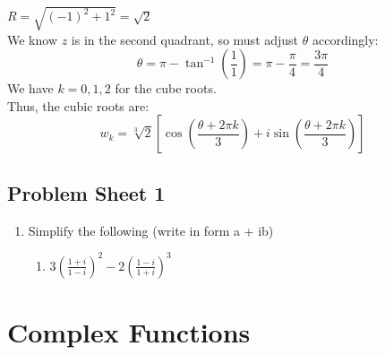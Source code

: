 \documentclass[a4paper, 10pt]{article}
\begin{document}
\begin{examplebox}[Find the cube roots of $z = -1 + i$]
  $R = \sqrt{(-1)^2 + 1^2} = \sqrt{2}$ \\
  We know $z$ is in the second quadrant, so must adjust $\theta$ accordingly:
  $$\theta = \pi - \tan^{-1}\left(\frac{1}{1}\right) = \pi - \frac{\pi}{4} = \frac{3\pi}{4}$$
  We have $k = 0,1,2$ for the cube roots. \\
  Thus, the cubic roots are:
  $$w_k = \sqrt[3]{2} \left[\cos\left(\frac{\theta + 2\pi k}{3}\right) + i\sin\left(\frac{\theta + 2\pi k}{3}\right)\right]$$
\end{examplebox}

\subsection{Problem Sheet 1}
\begin{enumerate}
  \item Simplify the following (write in form a + ib)
        \begin{enumerate}
          \item $3\left( \frac{1+ i}{1-i} \right)^2 - 2\left(\frac{1-i}{1+i}\right)^3$
        \end{enumerate}
\end{enumerate}

\pagebreak

\section{Complex Functions}
\end{document}
